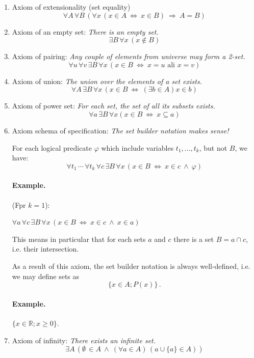 \documentclass[11pt,paper=b5,footinclude,headinclude]{scrbook} %
\def\inn {{~\wedge~}}
\def\sledi {{~\Rightarrow~}}
\def\cee {{~\Leftrightarrow~}}
\theoremstyle{remark}
\theoremstyle{definition} %
\theoremstyle{theorem} %
\begin{document}
\begin{enumerate}
	\item Axiom of extensionality (set equality)
	$$\forall A\, \forall B\, (\forall x \,(x\in A \cee x\in B) \sledi A = B)$$
	
	\item Axiom of an empty set:
	\emph{ There is an empty set.}
	$$\exists B\, \forall x\, (x\not \in B)$$
	
	\item Axiom of pairing: \emph{ Any couple of elements from universe may form a 2-set.}
	$$\forall u\, \forall v\, \exists B\, \forall x\, (x\in B \cee x = u\textrm{ ali }x = v)$$
	
	\item Axiom of union: \emph{ The union over the elements of a set exists. }
	$$\forall A\, \exists B\, \forall x\, (x\in B \cee (\exists b\in A) x\in b)$$
	
	\item Axiom of power set: \emph{ For each set, the set of all its subsets exists.}
	$$\forall a\, \exists B\, \forall x (x\in B \cee x\subseteq a)$$
	
	\item Axiom schema of specification: \emph{  The set builder notation makes sense!}
	
	For each logical predicate $\varphi$ which include variables $t_1,\ldots, t_k$, but not  $B$, we have:
	$$\forall t_1\,\cdots\, \forall t_k\,\forall c\,\exists B \,\forall x \,(x\in B \cee x\in c \inn \varphi)$$
	
	\paragraph{Example.}
	(Fpr $k = 1$):
	
	$\forall a \,\forall c \,\exists B \, \forall x\, (x\in B \cee x\in c \inn x\in a)$
	
	This means in particular that for each sets $a$ and $c$ there is a set  $B = a\cap c$, i.e. their intersection.
	
	\medskip
	As a result of this axiom, the set builder notation is always well-defined, i.e. we may define sets as
	$$\{x\in A; P(x)\}\,.$$
	
	\paragraph{Example.} $\{x\in \mathbb{R}; x\ge 0\}$.
	
	\item Axiom of infinity: \emph{ There exists an infinite set.}
	$$\exists A\,(\emptyset \,\in A \inn (\forall a\in A)\, (a\cup \{a\}\in A))$$
	


\end{enumerate}
\end{document}
